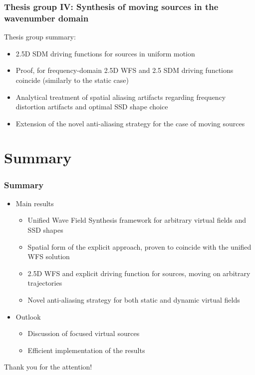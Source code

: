\documentclass{beamer}
\begin{document}
\begin{frame}
\frametitle{Thesis group IV: Synthesis of moving sources in the wavenumber domain}
Thesis group summary:
	\vspace{3mm}	
	\begin{itemize}
	\item 2.5D SDM driving functions for sources in uniform motion
	\vspace{3mm}	
	\item Proof, for frequency-domain 2.5D WFS and 2.5 SDM driving functions coincide (similarly to the static case)
	\vspace{3mm}	
	\item Analytical treatment of spatial aliasing artifacts regarding frequency distortion artifacts and optimal SSD shape choice
	\vspace{3mm}	
	\item Extension of the novel anti-aliasing strategy for the case of moving sources
	\end{itemize}
\end{frame}

\section{Summary}
\begin{frame}
\frametitle{Summary}
\begin{itemize}
\item Main results
	\vspace{3mm}	
	\begin{itemize}
	\item Unified Wave Field Synthesis framework for arbitrary virtual fields and SSD shapes	\vspace{3mm}	
	\item Spatial form of the explicit approach, proven to coincide with the unified WFS solution 	\vspace{3mm}	
	\item 2.5D WFS and explicit driving function for sources, moving on arbitrary trajectories 	\vspace{3mm}	
	\item Novel anti-aliasing strategy for both static and dynamic virtual fields
	\end{itemize}
\item Outlook
	\begin{itemize}
	\item Discussion of focused virtual sources	\vspace{3mm}	
	\item Efficient implementation of the results
	\end{itemize}
\end{itemize}
\end{frame}

\begin{frame}
\Huge{\centerline{Thank you for the attention!}}
\end{frame}

\end{document}
